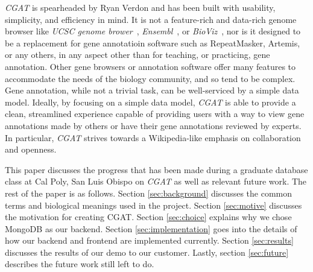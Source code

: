 \documentclass[10pt, conference, compsocconf]{IEEEtran}
\begin{document}
\textit{CGAT} is spearheaded by Ryan Verdon and has been built with usability,
simplicity, and efficiency in mind. It is not a feature-rich and data-rich
genome browser like \textit{UCSC genome brower}~\cite{ucscbrowser},
\textit{Ensembl}~\cite{ensembl}, or \textit{BioViz}~\cite{bioviz}, nor is it
designed to be a replacement for gene annotatioin software such as
RepeatMasker, Artemis, or any others, in any aspect other than for teaching, or
practicing, gene annotation. Other gene browsers or annotation software offer
many features to accommodate the needs of the biology community, and so tend to
be complex. Gene annotation, while not a trivial task, can be well-serviced by
a simple data model. Ideally, by focusing on a simple data model, \textit{CGAT}
is able to provide a clean, streamlined experience capable of providing users
with a way to view gene annotations made by others or have their gene
annotations reviewed by experts. In particular, \textit{CGAT} strives towards a
Wikipedia-like emphasis on collaboration and openness.

This paper discusses the progress that has been made during a graduate database
class at Cal Poly, San Luis Obispo on \textit{CGAT} as well as relevant future
work. The rest of the paper is as follows. Section \ref{sec:background}
discusses the common terms and biological meanings used in the project. Section
\ref{sec:motive} discusses the motivation for creating CGAT. Section
\ref{sec:choice} explains why we chose MongoDB as our backend. Section
\ref{sec:implementation} goes into the details of how our backend and frontend
are implemented currently. Section \ref{sec:results} discusses the results of
our demo to our customer. Lastly, section \ref{sec:future} describes the future
work still left to do.
\end{document}
